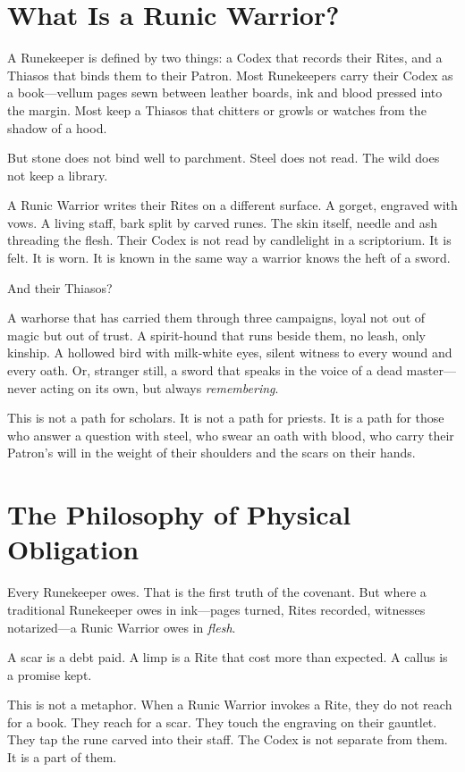 \section{What Is a Runic Warrior?}

A Runekeeper is defined by two things: a Codex that records their Rites, and a Thiasos that binds them to their Patron. Most Runekeepers carry their Codex as a book—vellum pages sewn between leather boards, ink and blood pressed into the margin. Most keep a Thiasos that chitters or growls or watches from the shadow of a hood.

But stone does not bind well to parchment. Steel does not read. The wild does not keep a library.

A Runic Warrior writes their Rites on a different surface. A gorget, engraved with vows. A living staff, bark split by carved runes. The skin itself, needle and ash threading the flesh. Their Codex is not read by candlelight in a scriptorium. It is felt. It is worn. It is known in the same way a warrior knows the heft of a sword.

And their Thiasos?

A warhorse that has carried them through three campaigns, loyal not out of magic but out of trust. A spirit-hound that runs beside them, no leash, only kinship. A hollowed bird with milk-white eyes, silent witness to every wound and every oath. Or, stranger still, a sword that speaks in the voice of a dead master—never acting on its own, but always \textit{remembering}.

This is not a path for scholars. It is not a path for priests. It is a path for those who answer a question with steel, who swear an oath with blood, who carry their Patron's will in the weight of their shoulders and the scars on their hands.

\section{The Philosophy of Physical Obligation}

Every Runekeeper owes. That is the first truth of the covenant. But where a traditional Runekeeper owes in ink—pages turned, Rites recorded, witnesses notarized—a Runic Warrior owes in \textit{flesh}.

A scar is a debt paid. A limp is a Rite that cost more than expected. A callus is a promise kept.

This is not a metaphor. When a Runic Warrior invokes a Rite, they do not reach for a book. They reach for a scar. They touch the engraving on their gauntlet. They tap the rune carved into their staff. The Codex is not separate from them. It is a part of them.


